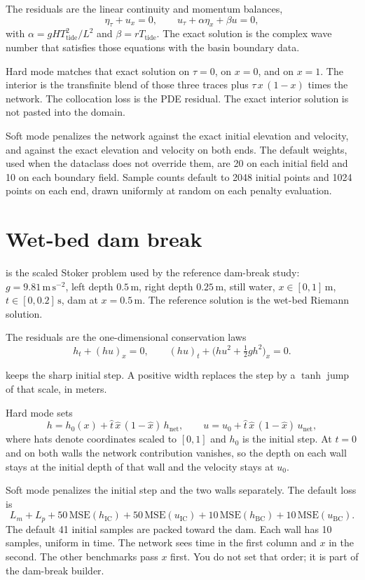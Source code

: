 The residuals are the linear continuity and momentum balances,
\[
\eta_{\tau} + u_{x} = 0,
\qquad
u_{\tau} + \alpha \eta_{x} + \beta u = 0,
\]
with \(\alpha = g H T_{\mathrm{tide}}^{2}/L^{2}\) and \(\beta = r T_{\mathrm{tide}}\).
The exact solution is the complex wave number that satisfies those equations with the basin boundary data.

Hard mode matches that exact solution on \(\tau=0\), on \(x=0\), and on \(x=1\).
The interior is the transfinite blend of those three traces plus \(\tau\, x\,(1-x)\) times the network.
The collocation loss is the PDE residual.
The exact interior solution is not pasted into the domain.

Soft mode penalizes the network against the exact initial elevation and velocity, and against the exact elevation and velocity on both ends.
The default weights, used when the dataclass does not override them, are 20 on each initial field and 10 on each boundary field.
Sample counts default to 2048 initial points and 1024 points on each end, drawn uniformly at random on each penalty evaluation.

\section{Wet-bed dam break}

 is the scaled Stoker problem used by the reference dam-break study:
\(g=9.81\,\mathrm{m\,s^{-2}}\), left depth \(0.5\,\mathrm{m}\), right depth \(0.25\,\mathrm{m}\), still water, \(x\in[0,1]\,\mathrm{m}\), \(t\in[0,0.2]\,\mathrm{s}\), dam at \(x=0.5\,\mathrm{m}\).
The reference solution is the wet-bed Riemann solution.

The residuals are the one-dimensional conservation laws
\[
h_{t} + (hu)_{x} = 0,
\qquad
(hu)_{t} + \big(hu^{2} + \tfrac12 g h^{2}\big)_{x} = 0.
\]

 keeps the sharp initial step.
A positive width replaces the step by a \(\tanh\) jump of that scale, in meters.

Hard mode sets
\[
h = h_{0}(x) + \hat{t}\,\hat{x}\,(1-\hat{x})\, h_{\mathrm{net}},
\qquad
u = u_{0} + \hat{t}\,\hat{x}\,(1-\hat{x})\, u_{\mathrm{net}},
\]
where hats denote coordinates scaled to \([0,1]\) and \(h_{0}\) is the initial step.
At \(t=0\) and on both walls the network contribution vanishes, so the depth on each wall stays at the initial depth of that wall and the velocity stays at \(u_{0}\).

Soft mode penalizes the initial step and the two walls separately.
The default loss is
\[
L_{m} + L_{p} + 50\,\mathrm{MSE}(h_{\mathrm{IC}}) + 50\,\mathrm{MSE}(u_{\mathrm{IC}})
+ 10\,\mathrm{MSE}(h_{\mathrm{BC}}) + 10\,\mathrm{MSE}(u_{\mathrm{BC}}).
\]
The default 41 initial samples are packed toward the dam.
Each wall has 10 samples, uniform in time.
The network sees time in the first column and \(x\) in the second.
The other benchmarks pass \(x\) first.
You do not set that order; it is part of the dam-break builder.

